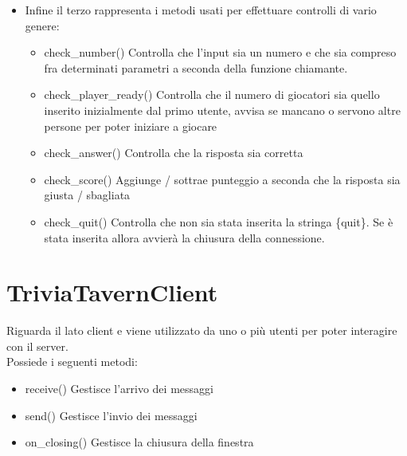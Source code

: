 \documentclass[a4paper,12pt]{report}
\begin{document}
\begin{itemize}
        \item Infine il terzo rappresenta i metodi usati per effettuare controlli di vario genere:
            \begin{itemize}
                \item check\_number() Controlla che l'input sia un numero e che sia compreso fra determinati parametri a seconda della funzione chiamante.
                \item check\_player\_ready() Controlla che il numero di giocatori sia quello inserito inizialmente dal primo utente, avvisa se mancano o servono altre persone per poter iniziare a giocare
                \item check\_answer() Controlla che la risposta sia corretta
                \item check\_score() Aggiunge / sottrae punteggio a seconda che la risposta sia giusta / sbagliata
                \item check\_quit() Controlla che non sia stata inserita la stringa \{quit\}. Se è stata inserita allora avvierà la chiusura della connessione.
            \end{itemize}
            
        \end{itemize}
        
    \newpage
    \section{TriviaTavernClient} 
        Riguarda il lato client e viene utilizzato da uno o più utenti per poter interagire con il server. \\
        Possiede i seguenti metodi: \\
        \begin{itemize}
            \item receive() Gestisce l'arrivo dei messaggi
            \item send() Gestisce l'invio dei messaggi
            \item on\_closing() Gestisce la chiusura della finestra
        \end{itemize}
        
\end{document}
